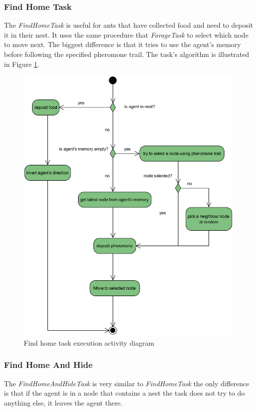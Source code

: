 \subsubsection{Find Home Task}
\label{task:find-home}

The \emph{FindHomeTask} is useful for ants that have collected food and need to deposit it in their nest. It uses the same procedure that \emph{ForageTask} to select which node to move next. The biggest difference is that it tries to use the agent's memory before following the specified pheromone trail. The task's algorithm is illustrated in Figure \ref{fig:find-home-act}.

\begin{figure}[H]
  \centering
  \includegraphics[width=0.9\linewidth]{gfx/uml-act-home.png}
  \caption{Find home task execution activity diagram}
  \label{fig:find-home-act}
\end{figure}

\subsubsection{Find Home And Hide}
\label{task:find-home-hide}

The \emph{FindHomeAndHideTask} is very similar to \emph{FindHomeTask} the only difference is that if the agent is in a node that contains a nest the task does not try to do anything else, it leaves the agent there. 


